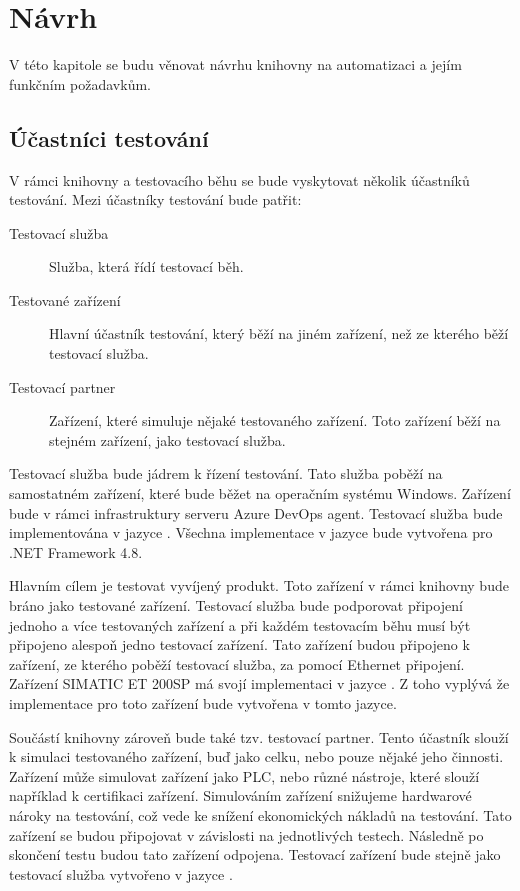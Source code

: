 \chapter{Návrh}\label{chap:design}

V této kapitole se budu věnovat návrhu knihovny na automatizaci a jejím funkčním požadavkům.

\section{Účastníci testování}\label{sec:participants}
V rámci knihovny a testovacího běhu se bude vyskytovat několik účastníků testování. Mezi účastníky testování bude patřit:

\begin{description}
    \item[Testovací služba] Služba, která řídí testovací běh.
    \item[Testované zařízení] Hlavní účastník testování, který běží na jiném zařízení, než ze kterého běží testovací služba. 
    \item[Testovací partner] Zařízení, které simuluje nějaké testovaného zařízení. Toto zařízení běží na stejném zařízení, jako testovací služba. 
\end{description}

Testovací služba bude jádrem k řízení testování. Tato služba poběží na samostatném zařízení, které bude běžet na operačním systému Windows. Zařízení bude v rámci infrastruktury serveru Azure DevOps agent. Testovací služba bude implementována v jazyce \csharp{}. Všechna implementace v jazyce \csharp{} bude vytvořena pro .NET Framework 4.8. 

Hlavním cílem je testovat vyvíjený produkt. Toto zařízení v rámci knihovny bude bráno jako testované zařízení. Testovací služba bude podporovat připojení jednoho a více testovaných zařízení a při každém testovacím běhu musí být připojeno alespoň jedno testovací zařízení. Tato zařízení budou připojeno k zařízení, ze kterého poběží testovací služba, za pomocí Ethernet připojení. Zařízení SIMATIC ET 200SP má svojí implementaci v jazyce \cpp{}. Z toho vyplývá že implementace pro toto zařízení bude vytvořena v tomto jazyce. 

Součástí knihovny zároveň bude také tzv. testovací partner. Tento účastník slouží k simulaci testovaného zařízení, buď jako celku, nebo pouze nějaké jeho činnosti. Zařízení může simulovat zařízení jako PLC, nebo různé nástroje, které slouží například k certifikaci zařízení. Simulováním zařízení snižujeme hardwarové nároky na testování, což vede ke snížení ekonomických nákladů na testování. Tato zařízení se budou připojovat v závislosti na jednotlivých testech. Následně po skončení testu budou tato zařízení odpojena. Testovací zařízení bude stejně jako testovací služba vytvořeno v jazyce \csharp{}.

